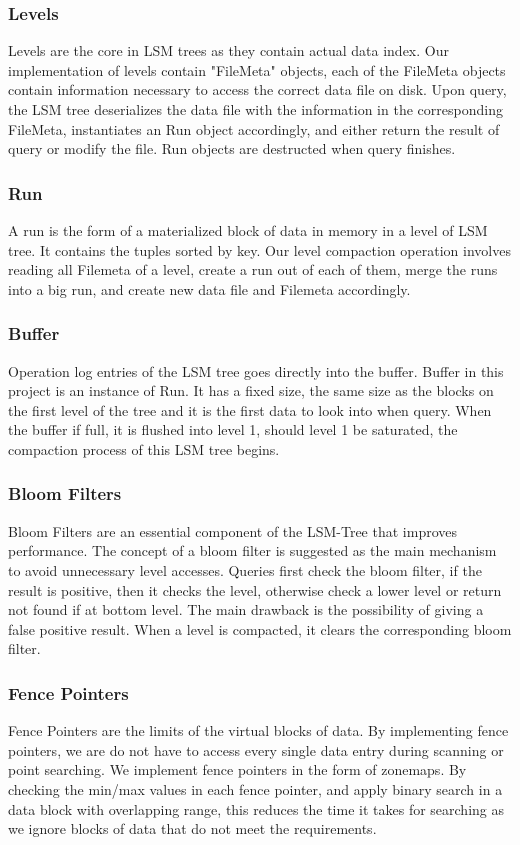 \documentclass[sigconf]{acmart}
\begin{document}
    \subsubsection{Levels}
    Levels are the core in LSM trees as they contain actual data index. Our implementation of levels contain "FileMeta" objects, each of the FileMeta objects contain information necessary to access the correct data file on disk. Upon query, the LSM tree deserializes the data file with the information in the corresponding FileMeta, instantiates an Run object accordingly, and either return the result of query or modify the file. Run objects are destructed when query finishes.
    \subsubsection{Run}
    A run is the form of a materialized block of data in memory in a level of LSM tree. It contains the tuples sorted by key. Our level compaction operation involves reading all Filemeta of a level, create a run out of each of them, merge the runs into a big run, and create new data file and Filemeta accordingly.
    \subsubsection{Buffer}
    Operation log entries of the LSM tree goes directly into the buffer. Buffer in this project is an instance of Run. It has a fixed size, the same size as the blocks on the first level of the tree and it is the first data to look into when query. When the buffer if full, it is flushed into level 1, should level 1 be saturated, the compaction process of this LSM tree begins.
    \subsubsection{Bloom Filters}
    Bloom Filters are an essential component of the LSM-Tree that improves performance. The concept of a bloom filter is suggested as the main mechanism to avoid unnecessary level accesses. Queries first check the bloom filter, if the result is positive, then it checks the level, otherwise check a lower level or return not found if at bottom level. The main drawback is the possibility of giving a false positive result. When a level is compacted, it clears the corresponding bloom filter.
    \subsubsection{Fence Pointers}
    Fence Pointers are the limits of the virtual blocks of data. By implementing fence pointers, we are do not have to access every single data entry during scanning or point searching. We implement fence pointers in the form of zonemaps. By checking the min/max values in each fence pointer, and apply binary search in a data block with overlapping range, this reduces the time it takes for searching as we ignore blocks of data that do not meet the requirements.
    
\end{document}
